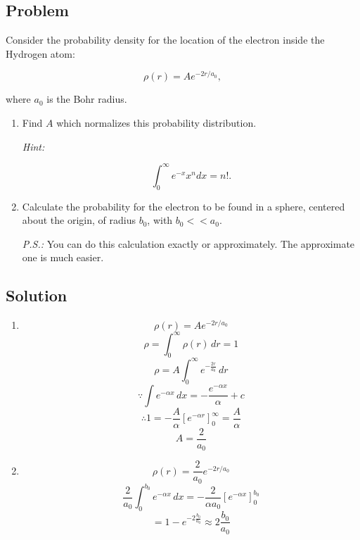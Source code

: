 \documentclass[12pt]{article}
\begin{document}
\subsection{Problem}

Consider the probability density for the location of the electron inside the Hydrogen atom:

\begin{equation}
    \rho(r)=A e^{-2 r / a_{0}},
\end{equation}

where $a_{0}$ is the Bohr radius.

\renewcommand{\labelenumi}{(\alph{enumi})}
\begin{enumerate}
    \item Find $A$ which normalizes this probability distribution.

          \textit{Hint:}

          \begin{equation}
              \int_{0}^{\infty} e^{-x} x^{n} d x=n!.
          \end{equation}
    \item Calculate the probability for the electron to be found in a sphere, centered about the origin, of radius $b_{0}$, with $b_{0}<<a_{0}$.

          \textit{P.S.:} You can do this calculation exactly or approximately. The approximate one is much easier.
\end{enumerate}

\subsection{Solution}


\renewcommand{\labelenumi}{(\alph{enumi})}
\begin{enumerate}
    \item
          \[
              \rho(r) = A e^{-2 r / a_{0}}
          \]
          \[
              \rho = \int_{0}^{\infty}{\rho(r)}\,dr = 1
          \]
          \[
              \rho = A \int_{0}^{\infty}{e^{-\frac{2r}{a_{0}}}}\,dr
          \]
          \[
              \because \int{e^{-\alpha x}}\,dx = -\frac{e^{-\alpha x}}{\alpha} + c
          \]
          \[
              \therefore 1 = - \frac{A}{\alpha}{\left[e^{- \alpha r}\right]}^{\infty}_0 = \frac{A}{\alpha}
          \]
          \[
              A = \frac{2}{a_0}
          \]
    \item
          \[
              \rho(r) = \frac{2}{a_0} e^{-2 r / a_{0}}
          \]
          \[
              \frac{2}{a_0}\int_0^{b_0}{e^{-\alpha x}}\,dx = -\frac{2}{\alpha a_0}\left[e^{-\alpha x}\right]^{b_0}_0
          \]
          \[
              = 1 - e^{-2 \frac{b_0}{a_0}} \approx 2 \frac{b_0}{a_0}
          \]
\end{enumerate}
\end{document}
